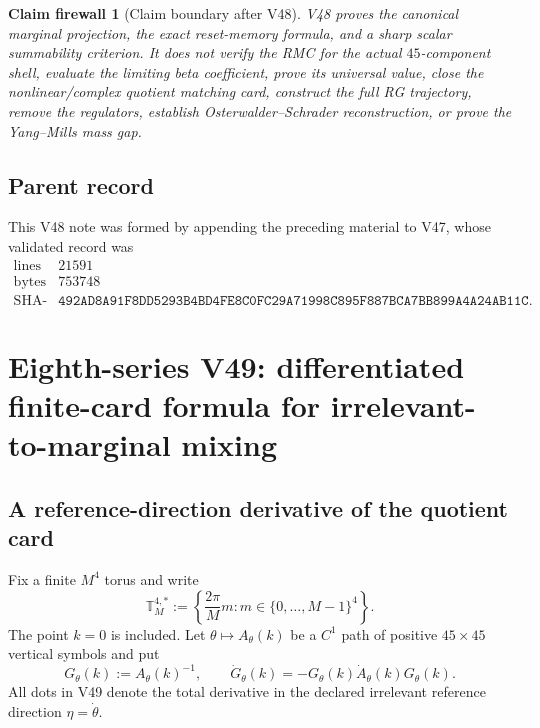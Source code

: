 \documentclass[11pt,oneside]{book}
\newtheorem{firewall}[theorem]{Claim firewall}
\theoremstyle{definition}
\theoremstyle{remark}
\begin{document}
\begin{firewall}[Claim boundary after V48]
\label{fire:e8v48-claim}
V48 proves the canonical marginal projection, the exact
reset-memory formula, and a sharp scalar summability criterion.  It
does not verify the RMC for the actual \(45\)-component shell,
evaluate the limiting beta coefficient, prove its universal value,
close the nonlinear/complex quotient matching card, construct the
full RG trajectory, remove the regulators, establish
Osterwalder--Schrader reconstruction, or prove the Yang--Mills mass
gap.
\end{firewall}

\subsection{Parent record}

This V48 note was formed by appending the preceding material to V47,
whose validated record was
\[
\begin{array}{c|c}
\text{lines}&21591\\
\text{bytes}&753748\\
\text{SHA-256}&
\texttt{492AD8A91F8DD5293B4BD4FE8C0FC29A71998C895F887BCA7BB899A4A24AB11C}.
\end{array}
\]



\section{Eighth-series V49: differentiated finite-card formula for
irrelevant-to-marginal mixing}
\label{sec:e8v49}

\subsection{A reference-direction derivative of the quotient card}

Fix a finite \(M^4\) torus and write
\[
 {\mathbb T}_M^{4,*}
 :=\left\{\frac{2\pi}{M}m:
 m\in\{0,\ldots,M-1\}^4\right\}.                              \tag{49.1}
\]
The point \(k=0\) is included.  Let \(\theta\mapsto A_\theta(k)\)
be a \(C^1\) path of positive \(45\times45\) vertical symbols and
put
\[
 G_\theta(k):=A_\theta(k)^{-1},\qquad
 \dot G_\theta(k)
 =-G_\theta(k)\dot A_\theta(k)G_\theta(k).                    \tag{49.2}
\]
All dots in V49 denote the total derivative in the declared
irrelevant reference direction \(\eta=\dot\theta\).
\end{document}
